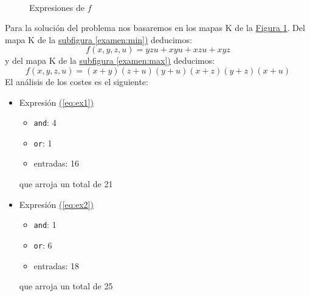 \begin{solution}
  \begin{figure}
    \centering
    \mbox{
      \qquad
    }
    \caption{\label{examen:total} Expresiones de $f$}
  \end{figure}
  Para la solución del problema nos basaremos en los mapas K de la
  \hyperref[examen:total]{Figura \ref*{examen:total}}. Del mapa K de
  la \hyperref[examen:min]{subfigura \ref*{examen:min})} deducimos:
  \begin{equation}
    \label{eq:ex1}
    f(x,y,z,u)=yzu+xyu+xzu+xyz
  \end{equation}
  y del mapa K de
  la \hyperref[examen:max]{subfigura \ref*{examen:max})} deducimos:
  \begin{equation}
    \label{eq:ex2}
    f(x,y,z,u)=(x+y)(z+u)(y+u)(x+z)(y+z)(x+u)
  \end{equation}
  El análisis de los costes es el siguiente:
  \begin{itemize}
  \item Expresión \hyperref[eq:ex1]{(\ref*{eq:ex1})}
    \begin{itemize}
    \item \texttt{and}: 4
    \item \texttt{or}: 1
    \item entradas: 16
    \end{itemize}
    que arroja un total de 21
  \item Expresión \hyperref[eq:ex2]{(\ref*{eq:ex2})}
    \begin{itemize}
    \item \texttt{and}: 1
    \item \texttt{or}: 6
    \item entradas: 18
    \end{itemize}
    que arroja un total de 25
  \end{itemize}
\end{solution}


